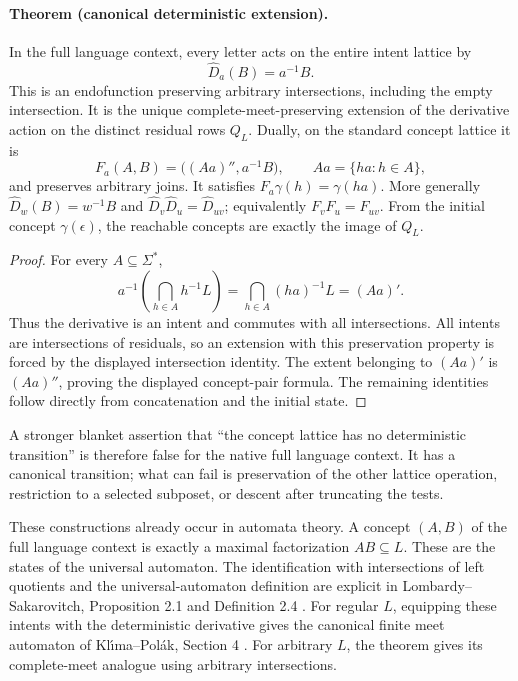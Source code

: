 \documentclass[11pt]{article}
\theoremstyle{remark}
\begin{document}
\paragraph{Theorem (canonical deterministic extension).}
In the full language context, every letter acts on the entire intent lattice by
\[
 \widehat D_a(B)=a^{-1}B.
 
\]
This is an endofunction preserving arbitrary intersections, including the
empty intersection. It is the unique complete-meet-preserving extension of
the derivative action on the distinct residual rows $Q_L$. Dually, on the standard concept lattice it is
\[
 F_a(A,B)=\bigl((Aa)'',a^{-1}B\bigr),\qquad
 Aa=\{ha:h\in A\},
 
\]
and preserves arbitrary joins. It satisfies
$F_a\gamma(h)=\gamma(ha)$. More generally $\widehat D_w(B)=w^{-1}B$ and
$\widehat D_v\widehat D_u=\widehat D_{uv}$; equivalently $F_vF_u=F_{uv}$.
From the initial concept $\gamma(\epsilon)$, the reachable concepts are
exactly the image of $Q_L$.
\begin{proof}
For every $A\subseteq\Sigma^*$,
\[
 a^{-1}\left(\bigcap_{h\in A}h^{-1}L\right)
 =\bigcap_{h\in A}(ha)^{-1}L=(Aa)'.
 
\]
Thus the derivative is an intent and commutes with all intersections.
All intents are intersections of residuals, so an extension with this
preservation property is forced by the displayed intersection identity.
The extent belonging to $(Aa)'$ is $(Aa)''$, proving the displayed
concept-pair formula. The remaining identities follow directly from
concatenation and the initial state.
\end{proof}
A stronger blanket assertion that ``the concept lattice has no deterministic
transition'' is therefore false for the native full language context.
It has a canonical transition; what can fail is preservation of the other
lattice operation, restriction to a selected subposet, or descent after
truncating the tests.

These constructions already occur in automata theory. A concept $(A,B)$ of
the full language context is exactly a maximal factorization $AB\subseteq L$. These are
the states of the universal automaton. The identification with intersections
of left quotients and the universal-automaton definition are explicit in
Lombardy--Sakarovitch, Proposition 2.1 and Definition 2.4
\cite{cg:universal}. For regular $L$, equipping these intents with the
deterministic derivative gives the canonical finite meet automaton of
Kl\'{\i}ma--Pol\'{a}k, Section 4 \cite{cg:meet}. For arbitrary $L$, the
theorem gives its complete-meet analogue using arbitrary intersections.
\end{document}
